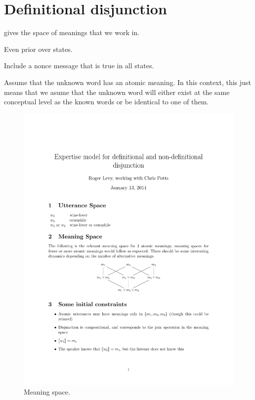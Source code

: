 \section{Definitional disjunction}\label{sec:defdisj}

 gives the space of meanings that we work in.

Even prior over states.

Include a nonce message that is true in all states.

Assume that the unknown word has an atomic meaning. In this context,
this just means that we asume that the unknown word will either exist
at the same conceptual level as the known words or be identical to one
of them.



\begin{figure}[htp]
  \centering
  \includegraphics[scale=1]{images/meaningspace}
  \caption{Meaning space.}
  \label{fig:meaningspace}
\end{figure}

